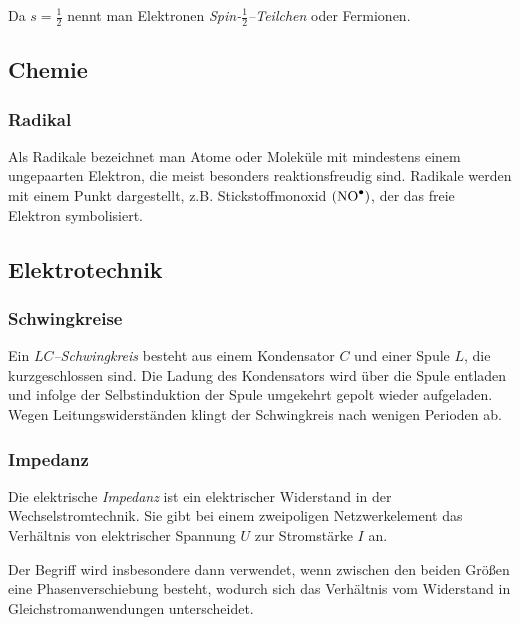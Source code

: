 \documentclass[12pt,a4paper]{scrartcl}
\numberwithin{equation}{section} %
\begin{document}
Da $s=\frac{1}{2}$ nennt man Elektronen
\emph{Spin-$\frac{1}{2}$--Teilchen} oder Fermionen.

\hypertarget{chemie}{%
\subsection{Chemie}\label{chemie}}

\hypertarget{radikal}{%
\subsubsection{Radikal}\label{radikal}}

Als Radikale bezeichnet man Atome oder Moleküle mit mindestens einem
ungepaarten Elektron, die meist besonders reaktionsfreudig sind.
Radikale werden mit einem Punkt dargestellt, z.B. Stickstoffmonoxid
$(\ce{NO^\bullet})$, der das freie Elektron symbolisiert.
\cite{Radikale}

\hypertarget{elektrotechnik}{%
\subsection{Elektrotechnik}\label{elektrotechnik}}

\hypertarget{schwingkreise}{%
\subsubsection{Schwingkreise}\label{schwingkreise}}

Ein \emph{$LC$--Schwingkreis} besteht aus einem Kondensator $C$ und
einer Spule $L$, die kurzgeschlossen sind. Die Ladung des Kondensators
wird über die Spule entladen und infolge der Selbstinduktion der Spule
umgekehrt gepolt wieder aufgeladen. Wegen Leitungswiderständen klingt
der Schwingkreis nach wenigen Perioden ab.

\hypertarget{impedanz}{%
\subsubsection{Impedanz}\label{impedanz}}

Die elektrische \emph{Impedanz} ist ein elektrischer Widerstand in der
Wechselstromtechnik. Sie gibt bei einem zweipoligen Netzwerkelement das
Verhältnis von elektrischer Spannung $U$ zur Stromstärke $I$ an.

Der Begriff wird insbesondere dann verwendet, wenn zwischen den beiden
Größen eine Phasenverschiebung besteht, wodurch sich das Verhältnis vom
Widerstand in Gleichstromanwendungen unterscheidet.
\end{document}
